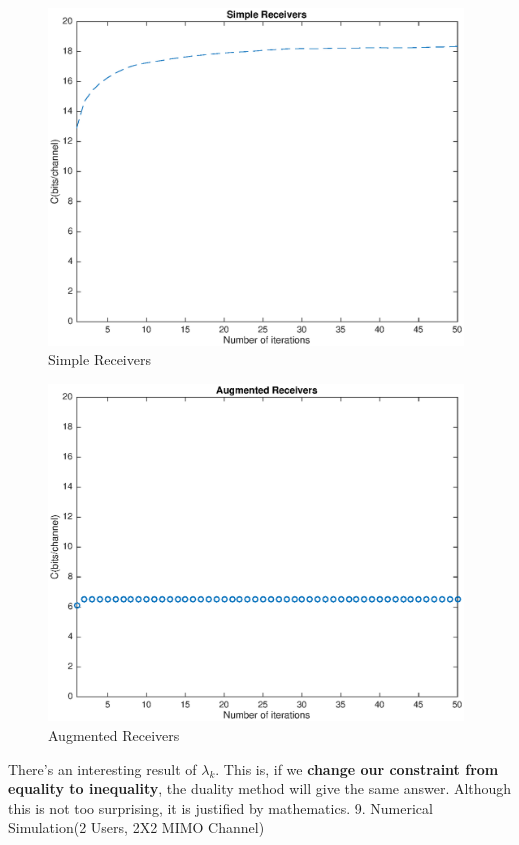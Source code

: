 \documentclass[11pt, oneside]{article}   	%
\begin{document}
 \begin{figure}[h]
    \centering
    \centerline{\includegraphics[width=110mm]{Simple_Receivers}}
    \caption{Simple Receivers}
\end{figure} 

\begin{figure}[h]
    \centering
    \centerline{\includegraphics[width=110mm]{Augmented_Receivers}}
    \caption{Augmented Receivers}
\end{figure} 





\newpage
There's an interesting result of $\lambda_{k}$. This is, if we \textbf{change our constraint from equality to inequality}, the duality method will give the same answer. Although this is not too surprising, it is justified by mathematics.
9. Numerical Simulation(2 Users, 2X2 MIMO Channel)
\end{document}
